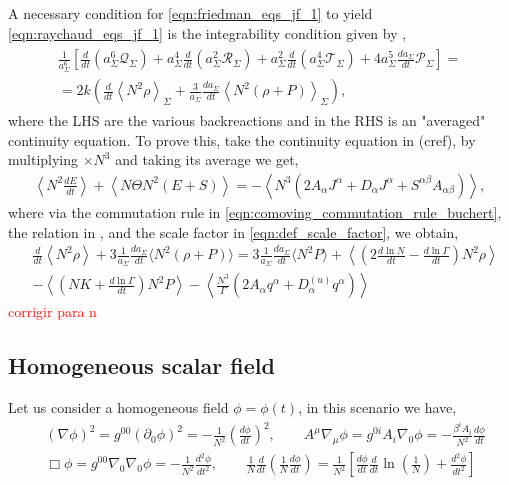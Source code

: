A necessary condition for \cref{eqn:friedman_eqs_jf_1} to yield \cref{eqn:raychaud_eqs_jf_1} is the integrability condition given by \cite{Buchert_2020},
\begin{align}
\begin{gathered}
\frac{1}{a_\Sigma^6}\left[\frac{d}{d t}\left(a_\Sigma^6\mathcal{Q}_{\Sigma}\right)+a_\Sigma^4\frac{d}{dt}\left(a_\Sigma^2\mathcal{R}_{\Sigma}\right)+a_\Sigma^2\frac{d}{dt}\left(a_\Sigma^4 \mathcal{T}_{\Sigma}\right)+4a_\Sigma^5\frac{da_\Sigma}{dt}\mathcal{P}_{\Sigma}\right]=\nonumber \\
=2k\left(\frac{d}{d t}\left\langle N^2 \rho\right\rangle_{\Sigma}+\frac{3}{a_{\Sigma}} \frac{d a_{\Sigma}}{d t}\left\langle N^2(\rho+P)\right\rangle_{\Sigma}\right),
\end{gathered}
\end{align}
where the LHS are the various backreactions and in the RHS is an "averaged" continuity equation. To prove this, take the continuity equation in (cref), by multiplying $\times N^3$ and taking its average we get,
\begin{align}
    \left\langle N^2\frac{d E}{dt}\right\rangle + \left\langle N\Theta N^2(E+S)\right\rangle =  -\left\langle N^3\left( 2 A_\alpha J^\alpha +  D_\alpha J^\alpha+ S^{\alpha\beta}A_{\alpha\beta}\right)\right\rangle,
\end{align}
where via the commutation rule in \cref{eqn:comoving_commutation_rule_buchert}, the relation in , and the scale factor in \cref{eqn:def_scale_factor}, we obtain,
\begin{align}
    &\frac{d}{dt}\left\langle N^2\rho\right\rangle+3\frac{1}{a_\Sigma}\frac{da_\Sigma}{dt}\langle N^2(\rho+P)\rangle=3\frac{1}{a_\Sigma}\frac{da_\Sigma}{dt}\langle N^2P\rangle+\left\langle \left(2\frac{d\ln N}{dt}-\frac{d\ln \Gamma}{dt}\right)N^2\rho\right\rangle\\
    &-\left\langle\left(NK+\frac{d\ln\Gamma}{dt}\right)N^2P\right\rangle-\left\langle \frac{N^3}{\Gamma}\left(2A_\alpha q^\alpha+D^{(u)}_\alpha q^\alpha\right)\right\rangle
\end{align}
\textcolor{red}{corrigir para n}



\subsection{Homogeneous scalar field}

Let us consider a homogeneous field $\phi=\phi(t)$, in this scenario we have,
\begin{align}
    &(\nabla\phi)^2=g^{00}(\partial_0\phi)^2=-\frac{1}{N^2}\left(\frac{d\phi}{dt}\right)^2, \qquad A^\mu\nabla_\mu\phi=g^{0i}A_i\nabla_0\phi=-\frac{\beta^i A_i}{N^2}\frac{d\phi}{dt}\\
    &\Box\phi=g^{00}\nabla_0\nabla_0\phi=-\frac{1}{N^2}\frac{d^2\phi}{dt^2},\qquad \frac{1}{N}\frac{d}{dt}\left(\frac{1}{N}\frac{d\phi}{dt}\right)=\frac{1}{N^2}\left[\frac{d\phi}{dt}\frac{d}{dt}\ln\left(\frac{1}{N}\right)+\frac{d^2\phi}{dt^2}\right]
\end{align}










